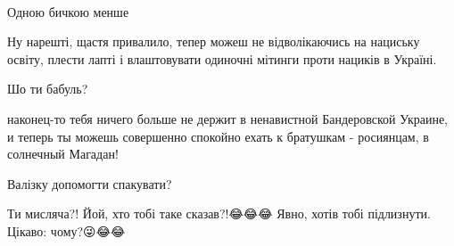 \begin{itemize}
🥳🥳🥳

 
Одною бичкою менше

 
Ну нарешті, щастя привалило, тепер можеш не відволікаючись на нациську освіту, плести лапті і влаштовувати одиночні мітинги проти нациків в Україні.

 
Шо ти бабуль?

 
наконец-то тебя ничего больше не держит в ненавистной Бандеровской Украине, и теперь ты можешь совершенно спокойно ехать к братушкам - росиянцам, в солнечный Магадан!

 
Валізку допомогти спакувати?

 
Ти мисляча?! Йой, хто тобі таке сказав?!😂😂😂 Явно, хотів тобі підлизнути. Цікаво: чому?😜😂😂

 

\end{itemize}
